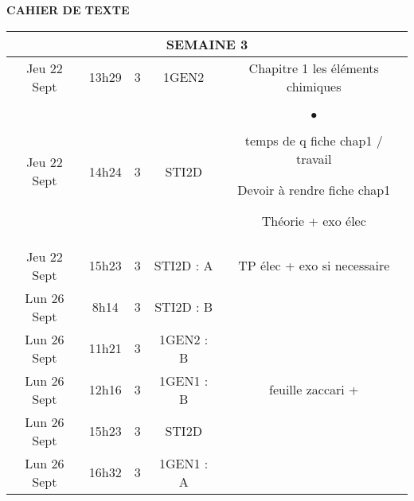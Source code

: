 \documentclass[10pt]{article}
\newcommand{\mypage}[1]{ 
		\begin{minipage}[c]{0.45\textwidth}
			\vspace{5pt}
			{#1}
			\vspace{5pt}
		\end{minipage}
}
\newcommand{\seancea}{	\mypage{Chapitre 1 les éléments chimiques}}
\newcommand{\seanceb}{	\mypage{\begin{list}{$\bullet$}{}
	\item temps de q fiche chap1 / travail
	\item Devoir à rendre fiche chap1
	\item Théorie + exo élec
\end{list}}}
\newcommand{\seancec}{	\mypage{TP élec + exo si necessaire}}
\newcommand{\seanced}{	\mypage{}}
\newcommand{\seancee}{	\mypage{}}
\newcommand{\seancef}{	\mypage{feuille zaccari +}}
\newcommand{\seanceg}{	\mypage{}}
\newcommand{\seanceh}{	\mypage{}}
\begin{document}
\begin{center}
	\textbf{CAHIER DE TEXTE}
\end{center}

\setlength{\tabcolsep}{13pt}
\renewcommand{\arraystretch}{2.5}
\begin{longtable}{@{}|c|c|c|c|c|@{}} \toprule
	\midrule\multicolumn{5}{||c||}{SEMAINE 3}      \\\midrule\midrule
	Jeu 22 Sept & 13h29 & 3 & 1GEN2     & \seancea \\\midrule
	Jeu 22 Sept & 14h24 & 3 & STI2D     & \seanceb \\\midrule
	Jeu 22 Sept & 15h23 & 3 & STI2D : A & \seancec \\\midrule\midrule
	Lun 26 Sept & 8h14  & 3 & STI2D : B & \seanced \\\midrule
	Lun 26 Sept & 11h21 & 3 & 1GEN2 : B & \seancee \\\midrule
	Lun 26 Sept & 12h16 & 3 & 1GEN1 : B & \seancef \\\midrule
	Lun 26 Sept & 15h23 & 3 & STI2D     & \seanceg \\\midrule
	Lun 26 Sept & 16h32 & 3 & 1GEN1 : A & \seanceh \\\midrule


	\bottomrule
\end{longtable}
\end{document}
